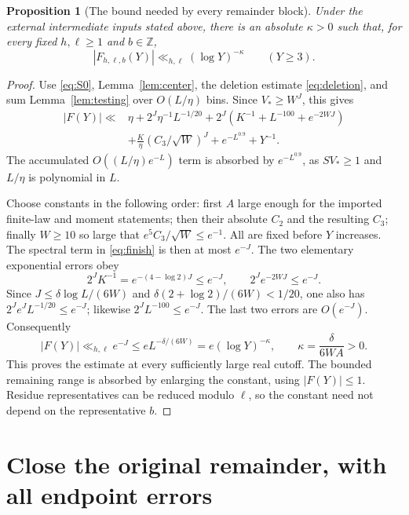 \documentclass[11pt,a4paper]{article}
\numberwithin{equation}{section}
\newtheorem{proposition}[theorem]{Proposition}
\theoremstyle{remark}\newtheorem{remark}[theorem]{Remark}
\newcommand{\Z}{\mathbb Z}
\newcommand{\1}{\mathbf 1}
\begin{document}
\begin{proposition}[The bound needed by every remainder block]
\label{prop:atoms}
Under the external intermediate inputs stated above, there is an
absolute $\kappa>0$ such that, for every fixed $h,\ell\ge1$ and
$b\in\Z$,
\begin{equation}\label{eq:atom}
 |F_{h,\ell,b}(Y)|\ll_{h,\ell}(\log Y)^{-\kappa}\qquad(Y\ge3).
\end{equation}
\end{proposition}
\begin{proof}
Use \eqref{eq:S0}, Lemma~\ref{lem:center}, the deletion estimate
\eqref{eq:deletion}, and sum Lemma~\ref{lem:testing} over
$O(L/\eta)$ bins. Since $V_*\ge W^J$, this gives
\begin{equation}\label{eq:finish}
 \begin{split}
 |F(Y)|\ll{}&\eta+2^J\eta^{-1}L^{-1/20}
 +2^J(K^{-1}+L^{-100}+e^{-2WJ})\\
 &+\frac K\eta(C_3/\sqrt W)^J+e^{-L^{0.9}}+Y^{-1}.
 \end{split}
\end{equation}
The accumulated $O((L/\eta)e^{-L})$ term is absorbed by
$e^{-L^{0.9}}$, as $SV_*\ge1$ and $L/\eta$ is polynomial in $L$.

Choose constants in the following order: first $A$ large enough for
the imported finite-law and moment statements; then their absolute
$C_2$ and the resulting $C_3$; finally $W\ge10$ so large that
$e^5C_3/\sqrt W\le e^{-1}$. All are fixed before $Y$ increases.
The spectral term in \eqref{eq:finish} is then at most $e^{-J}$.
The two elementary exponential errors obey
\[
 2^JK^{-1}=e^{-(4-\log2)J}\le e^{-J},\qquad
 2^Je^{-2WJ}\le e^{-J}.
\]
Since $J\le\delta\log L/(6W)$ and
$\delta(2+\log2)/(6W)<1/20$, one also has
$2^Je^JL^{-1/20}\le e^{-J}$; likewise $2^JL^{-100}\le e^{-J}$.
The last two errors are $O(e^{-J})$. Consequently
\[
 |F(Y)|\ll_{h,\ell}e^{-J}
 \le eL^{-\delta/(6W)}
 =e(\log Y)^{-\kappa},\qquad \kappa=\frac{\delta}{6WA}>0.
\]
This proves the estimate at every sufficiently large real cutoff.
The bounded remaining range is absorbed by enlarging the constant,
using $|F(Y)|\le1$. Residue representatives can be reduced modulo
$\ell$, so the constant need not depend on the representative $b$.
\end{proof}

\section{Close the original remainder, with all endpoint errors}
\label{sec:close}
\end{document}
